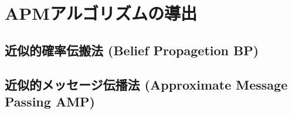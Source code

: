 \section{APMアルゴリズムの導出}
\label{sec:AMP}
\subsection{近似的確率伝搬法 (Belief Propagetion BP)}
\subsection{近似的メッセージ伝播法 (Approximate Message Passing AMP)}
